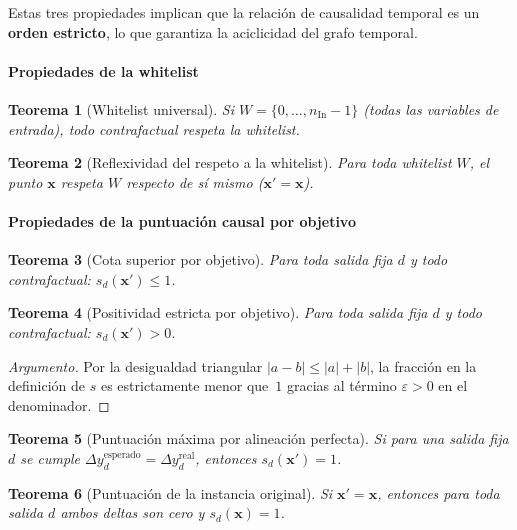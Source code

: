 \documentclass[12pt]{report} %
\newtheorem{theorem}{Teorema}
\begin{document}
Estas tres propiedades implican que la relación de causalidad temporal es un \textbf{orden estricto}, lo que garantiza la aciclicidad del grafo temporal.

\paragraph{Propiedades de la whitelist}

\begin{theorem}[Whitelist universal]
    Si $W = \{0, \ldots, n_{\text{In}}-1\}$ (todas las variables de entrada), todo contrafactual respeta la whitelist.
\end{theorem}

\begin{theorem}[Reflexividad del respeto a la whitelist]
    Para toda whitelist $W$, el punto $\mathbf{x}$ respeta $W$ respecto de sí mismo ($\mathbf{x}' = \mathbf{x}$).
\end{theorem}

\paragraph{Propiedades de la puntuación causal por objetivo}

\begin{theorem}[Cota superior por objetivo]
    Para toda salida fija $d$ y todo contrafactual: $s_d(\mathbf{x}') \leq 1$.
\end{theorem}

\begin{theorem}[Positividad estricta por objetivo]
    Para toda salida fija $d$ y todo contrafactual: $s_d(\mathbf{x}') > 0$.
\end{theorem}
\begin{proof}[Argumento]
    Por la desigualdad triangular $|a - b| \leq |a| + |b|$, la fracción en la definición de $s$ es estrictamente menor que~$1$ gracias al término $\varepsilon > 0$ en el denominador.
\end{proof}

\begin{theorem}[Puntuación máxima por alineación perfecta]
    Si para una salida fija $d$ se cumple $\Delta y_d^{\text{esperado}} = \Delta y_d^{\text{real}}$, entonces $s_d(\mathbf{x}') = 1$.
\end{theorem}

\begin{theorem}[Puntuación de la instancia original]
    Si $\mathbf{x}' = \mathbf{x}$, entonces para toda salida $d$ ambos deltas son cero y $s_d(\mathbf{x}) = 1$.
\end{theorem}
\end{document}
